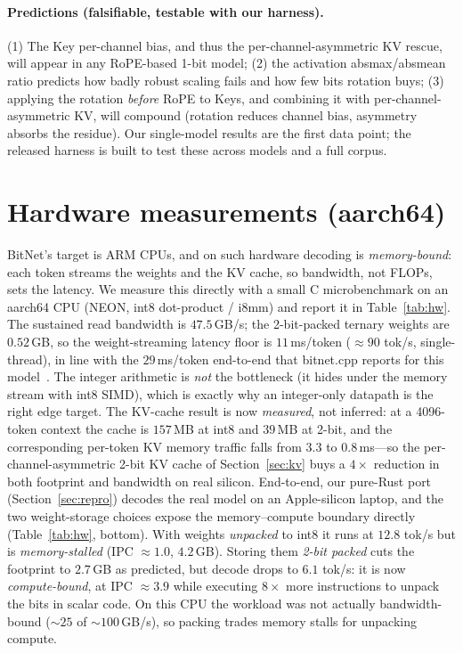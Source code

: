 \documentclass[11pt]{article}
\begin{document}
\paragraph{Predictions (falsifiable, testable with our harness).} (1) The Key
per-channel bias, and thus the per-channel-asymmetric KV rescue, will appear in any
RoPE-based 1-bit model; (2) the activation absmax/absmean ratio predicts how badly
robust scaling fails and how few bits rotation buys; (3) applying the rotation
\emph{before} RoPE to Keys, and combining it with per-channel-asymmetric KV, will
compound (rotation reduces channel bias, asymmetry absorbs the residue). Our
single-model results are the first data point; the released harness is built to test
these across models and a full corpus.

\section{Hardware measurements (aarch64)}
\label{sec:hw}
BitNet's target is ARM CPUs, and on such hardware decoding is \emph{memory-bound}:
each token streams the weights and the KV cache, so bandwidth, not FLOPs, sets the
latency. We measure this directly with a small C microbenchmark on an aarch64 CPU
(NEON, int8 dot-product / i8mm) and report it in Table~\ref{tab:hw}. The sustained
read bandwidth is $47.5$\,GB/s; the 2-bit-packed ternary weights are $0.52$\,GB, so
the weight-streaming latency floor is $11$\,ms/token ($\approx\!90$ tok/s,
single-thread), in line with the $29$\,ms/token end-to-end that bitnet.cpp reports
for this model~\cite{ma2024bitnet2b4t}. The integer arithmetic is \emph{not} the
bottleneck (it hides under the memory stream with int8 SIMD), which is exactly why
an integer-only datapath is the right edge target. The KV-cache result is now
\emph{measured}, not inferred: at a 4096-token context the cache is $157$\,MB at int8
and $39$\,MB at 2-bit, and the corresponding per-token KV memory traffic falls from
$3.3$ to $0.8$\,ms---so the per-channel-asymmetric 2-bit KV cache of
Section~\ref{sec:kv} buys a $4\times$ reduction in both footprint and bandwidth on
real silicon. End-to-end, our pure-Rust port (Section~\ref{sec:repro}) decodes the
real model on an Apple-silicon laptop, and the two weight-storage choices expose the
memory--compute boundary directly (Table~\ref{tab:hw}, bottom). With weights
\emph{unpacked} to int8 it runs at $12.8$ tok/s but is \emph{memory-stalled}
(IPC $\approx\!1.0$, $4.2$\,GB). Storing them \emph{2-bit packed} cuts the footprint
to $2.7$\,GB as predicted, but decode drops to $6.1$ tok/s: it is now
\emph{compute-bound}, at IPC $\approx\!3.9$ while executing $8\times$ more
instructions to unpack the bits in scalar code. On this CPU the workload was not
actually bandwidth-bound ($\sim\!25$ of $\sim\!100$\,GB/s), so packing trades memory
stalls for unpacking compute.
\end{document}
